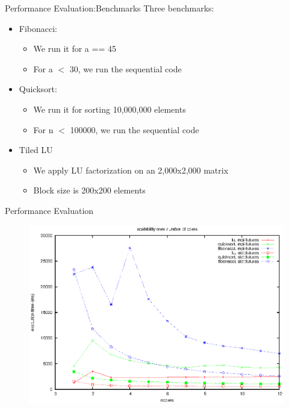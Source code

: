 \documentclass[svgnames]{beamer}
\begin{document}
\begin{frame}{Performance Evaluation:Benchmarks}
Three benchmarks:
\vfill
\begin{itemize}
	\item Fibonacci:
	\begin{itemize}
		\item We run it for a == 45
		\item For a $<$ 30, we run the sequential code
	\end{itemize} 
\vfill
	\item Quicksort:
	\begin{itemize}
		\item We run it for sorting 10,000,000 elements
		\item For n $<$ 100000, we run the sequential code
	\end{itemize}
\vfill
	\item Tiled LU
	\begin{itemize}
		\item We apply LU factorization on an 2,000x2,000 matrix
		\item Block size is 200x200 elements
	\end{itemize} 
\end{itemize}
\end{frame}
\begin{frame}{Performance Evaluation}
\begin{figure}
\center
\includegraphics[width=.7\textwidth]{images/scalability}
\end{figure}
\end{frame}
\end{document}
